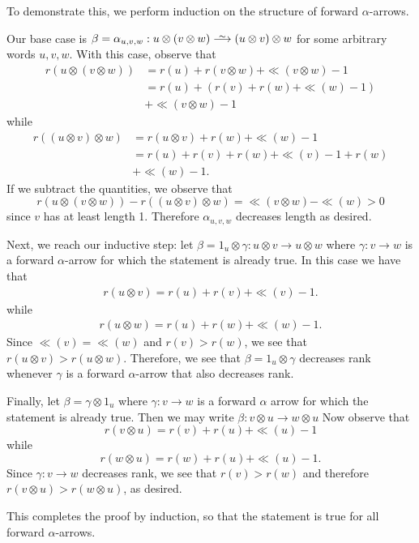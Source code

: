 \begin{prf}
    To demonstrate this, we perform induction on the structure of forward $\alpha$-arrows. 
    
    Our base case is
    $\beta = \alpha_{u, v, w}: u\otimes(v\otimes w) \isomarrow (u\otimes v)\otimes w$
    for some arbitrary words $u, v, w$. With this case, observe that
    \begin{align*}
        r(u\otimes(v\otimes w)) & = r(u) + r(v \otimes w) + \ll(v\otimes w) - 1\\
        & = r(u) + (r(v) + r(w) + \ll(w) - 1)\\
        &+ \ll(v\otimes w) - 1
    \end{align*}
    while 
    \begin{align*}
        r((u\otimes v)\otimes w) &= r(u\otimes v) + r(w) + \ll(w) - 1\\
        &= r(u) + r(v) + r(w) + \ll(v) - 1 + r(w) \\
        &+ \ll(w)- 1.
    \end{align*}
    If we subtract the quantities, we observe that 
    \[
        r(u\otimes(v\otimes w)) - r((u\otimes v)\otimes w) 
        = \ll(v\otimes w) - \ll(w) > 0
    \]
    since $v$ has at least length 1. Therefore $\alpha_{u,v,w}$ decreases 
    length as desired.

    Next, we reach our inductive step: let $\beta = 1_{u} \otimes \gamma : u \otimes v \to u \otimes w$ 
    where $\gamma: v \to w$ is a forward  $\alpha$-arrow
    for which the statement is already true.
    In this case we have that 
    \begin{align*}
        r(u\otimes v) = r(u) + r(v) + \ll(v) - 1.
    \end{align*}
    while 
    \begin{align*}
        r(u\otimes w) = r(u) + r(w) + \ll(w) - 1.
    \end{align*}
    Since $\ll(v) = \ll(w)$ and $r(v) > r(w)$, we see that 
    $r(u \otimes v) > r(u \otimes w)$.
    Therefore, we see that $\beta = 1_u \otimes \gamma$ decreases rank whenever 
    $\gamma$ is a forward $\alpha$-arrow that also decreases rank. 
    
    Finally, let $\beta = \gamma \otimes 1_{u}$ where $\gamma: v \to w$ 
    is a forward $\alpha$ arrow for which the statement is already true. 
    Then we may write $\beta: v \otimes u \to w \otimes u$ 
    Now observe that 
    \[
        r(v \otimes  u) = r(v) + r(u) + \ll(u) - 1
    \]
    while 
    \[
        r(w \otimes  u) = r(w) + r(u) + \ll(u) - 1.
    \]
    Since $\gamma: v \to w$ decreases rank, we see that $r(v) > r(w)$ and therefore
    $r(v \otimes u) > r(w \otimes u)$, as desired. 

    This completes the proof by induction, so that the statement
    is true for all forward $\alpha$-arrows. 
\end{prf}


